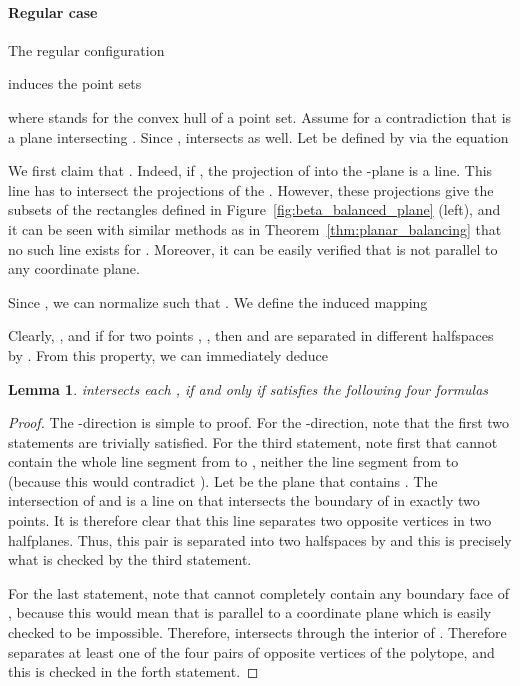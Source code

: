 \documentclass[12pt]{article}
\newtheorem{lemma}[theorem]{Lemma}
\begin{document}
\begin{appendix}
\paragraph{Regular case}
The regular configuration

induces the point sets

where  stands for the convex hull of a point set.
Assume for a contradiction that 
 is a plane intersecting . 
Since ,  intersects
 as well. 
Let  be defined by  via the equation

We first claim that . Indeed, if , the projection of  into the -plane
is a line. This line has to intersect the projections of the . However, these projections
give the subsets of the rectangles defined in Figure~\ref{fig:beta_balanced_plane} (left),
and it can be seen with similar methods as in Theorem~\ref{thm:planar_balancing} that no
such line exists for . Moreover, it can be easily verified that  is not
parallel to any coordinate plane.

Since , we can normalize such that . We define the induced mapping 

Clearly, , and
if for two points , , 
then  and  are separated in different halfspaces by .
From this property, we can immediately deduce

\begin{lemma}\label{lem:formula_1}
 intersects each ,  if and only if  satisfies the following four formulas


\end{lemma}

\begin{proof}
The -direction is simple to proof.
For the -direction, note that the
first two statements are trivially satisfied. For the third statement, 
note first that  cannot contain
the whole line segment from  to , neither the line segment
from  to  (because this would contradict ).
Let  be the plane
that contains . The intersection of  and  is a line on 
that intersects the boundary of  in exactly two points. It is therefore
clear that this line separates two opposite vertices in two halfplanes.
Thus, this pair is separated into two halfspaces by  and this is precisely
what is checked by the third statement.

For the last statement, note that  cannot completely contain
any boundary face of , because this would mean that  is
parallel to a coordinate plane which is easily checked to be impossible.
Therefore,  intersects through the interior of .
Therefore  separates at least one of the four pairs of opposite vertices of the polytope,
and this is checked in the forth statement.
\end{proof}


\end{appendix}
\end{document}
